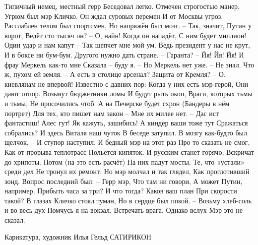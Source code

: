 \begin{multicols}{3} %
\setlength{\parindent}{0pt}
\obeycr
Типичный немец, местный герр
Беседовал легко.
Отмечен строгостью манер,
Угрюм был мэр Кличко.
\smallskip
Он ждал суровых перемен
И от Москвы угроз.
Расслаблен телом был спортсмен,
Но напряжён был мозг.
\smallskip
– Так, значит, Путин у ворот,
Ведёт сто тысяч он?
– О, найн! Когда он нападёт,
С ним будет миллион!
\smallskip
Один удар и нам капут – 
Так шепчет мне мой ум.
Ведь президент у нас не крут,
И в боксе ни бум-бум.
\smallskip
Другого нужно дать стране.
– Гаранта? – Йя! Йя! Йя!
И фрау Меркель как-то мне
Сказала – буду я.
\smallskip
– Но Меркель нет уже. – Не знал.
Что ж, пухом ей земля.
– А есть в столице арсенал?
Защита от Кремля?
\smallskip
– О, киевлянам не впервой!
Известно с давних пор:
Когда у них есть мэр-герой,
Они дают отпор.
\smallskip
Возьмут бюджетники ломы
И будут рыть окоп,
Враги, которых тьмы и тьмы,
Не просочились чтоб.
\smallskip
А на Печерске будет схрон
(Бандеры в нём портрет)
Для тех, кто пишет нам закон – 
Мне их милее нет.
\smallskip
– Дас ист фантастиш! Алес гут!
Як кажуть, зашибись!
А киндер ваши тоже тут
Сражаться собрались? 
\smallskip
И здесь Виталя наш чуток
В беседе затупил.
В мозгу как-будто был щелчок, –
И ступор наступил.
\smallskip
И бедный мэр на этот раз
Про то сказать не смог,
Как от прорыва теплотрасс
Польётся кипяток.
\smallskip
И русским станет горячо,
Вскричат до хрипоты.
Потом (на это есть расчёт)
На них падут мосты.
\smallskip
Те, что «устали» среди дел
Не тронул их ремонт.
Но мэр молчал и так глядел,
Как проглотивший зонд.
\smallskip
Вопрос последний был: – Герр мэр,
Что там ни говори,
А может Путин, например,
Прибыть часа за три?
\smallskip
И что тогда? Каков ваш план
При скорости такой?
В глазах Кличко стоял туман,
Но в сердце был покой.
\smallskip
– Возьму хлеб-соль и во весь дух
Помчусь я на вокзал,
Встречать врага. Однако вслух
Мэр это не сказал.
\restorecr
\end{multicols} %

Карикатура, художник Илья Гельд
САТИРИКОН
